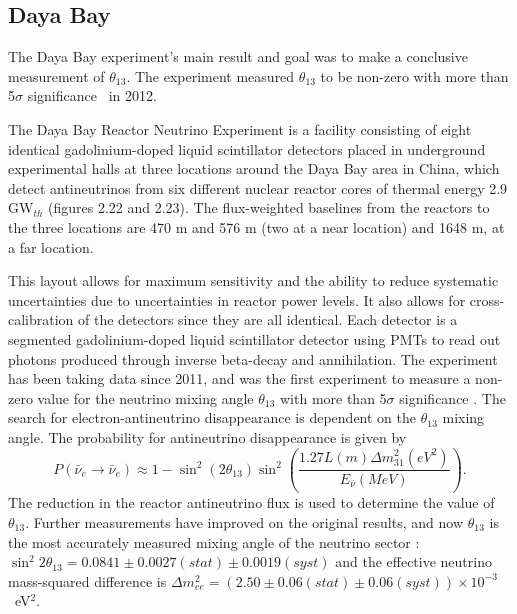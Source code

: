 \subsection{Daya Bay}

The Daya Bay experiment's main result and goal was to make a conclusive measurement of $\theta_{13}$. The experiment measured  $\theta_{13}$ to be non-zero with more than 5$\sigma$ significance~\cite{122An} in 2012.

The Daya Bay Reactor Neutrino Experiment is a facility consisting of eight identical gadolinium-doped  liquid scintillator detectors placed in underground experimental halls at three locations around the Daya Bay area in China, which detect antineutrinos from six different nuclear reactor cores of thermal energy 2.9 GW$_{th}$ (figures 2.22 and 2.23). The flux-weighted baselines from the reactors to the three locations are 470 m and 576 m (two at a near location) and 1648 m, at a far location.

This layout allows for maximum sensitivity and the ability to reduce systematic uncertainties due to uncertainties in reactor power levels. It also allows for cross-calibration of the detectors since they are all identical. Each detector is a segmented gadolinium-doped liquid scintillator detector using PMTs to read out photons produced through inverse beta-decay and annihilation. %
The experiment has been taking data since 2011, and was the first experiment to measure a non-zero value for the neutrino mixing angle $\theta_{13}$ with more than 5$\sigma$ significance \cite{122An}. The search for electron-antineutrino disappearance is dependent on the $\theta_{13}$ mixing angle. The probability for antineutrino disappearance is given by
\begin{equation}
P(\bar{\nu}_e \rightarrow \bar{\nu}_e)\approx 1 - \sin^2(2\theta_{13}) \sin^2\left(\frac{1.27 L(m) \Delta m^2_{31} (eV^2) }{E_{\bar{\nu}} (MeV)} \right) . 
\end{equation}
The reduction in the reactor antineutrino flux is used to determine the value of $\theta_{13}$. Further measurements have improved on the original results, and now $\theta_{13}$ is the most accurately measured mixing angle of the neutrino sector \cite{123An, 124An}:
$\sin^2 2\theta_{13} = 0.0841 \pm 0.0027(stat) \pm 0.0019(syst)$ and the
effective neutrino mass-squared difference is $\Delta m^2_{ee} = (2.50 \pm 0.06(stat) \pm 0.06(syst)) \times 10^{-3}$~eV$^2$.

